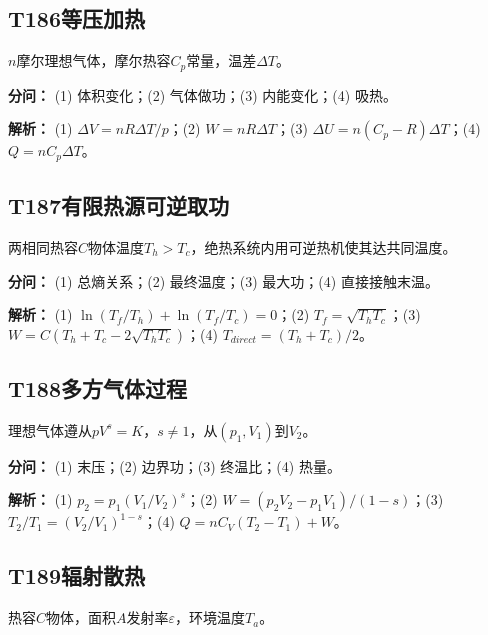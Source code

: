\medskip

\subsection*{T186\quad 等压加热}

$n$摩尔理想气体，摩尔热容$C_p$常量，温差$\Delta T$。

\par\textbf{分问：} (1) 体积变化；(2) 气体做功；(3) 内能变化；(4) 吸热。

\par\textbf{解析：} (1) $\Delta V=nR\Delta T/p$；(2) $W=nR\Delta T$；(3) $\Delta U=n(C_p-R)\Delta T$；(4) $Q=nC_p\Delta T$。

\medskip

\subsection*{T187\quad 有限热源可逆取功}

两相同热容$C$物体温度$T_h>T_c$，绝热系统内用可逆热机使其达共同温度。

\par\textbf{分问：} (1) 总熵关系；(2) 最终温度；(3) 最大功；(4) 直接接触末温。

\par\textbf{解析：} (1) $\ln(T_f/T_h)+\ln(T_f/T_c)=0$；(2) $T_f=\sqrt{T_hT_c}$；(3) $W=C(T_h+T_c-2\sqrt{T_hT_c})$；(4) $T_{direct}=(T_h+T_c)/2$。

\medskip

\subsection*{T188\quad 多方气体过程}

理想气体遵从$pV^s=K$，$s\ne1$，从$(p_1,V_1)$到$V_2$。

\par\textbf{分问：} (1) 末压；(2) 边界功；(3) 终温比；(4) 热量。

\par\textbf{解析：} (1) $p_2=p_1(V_1/V_2)^s$；(2) $W=(p_2V_2-p_1V_1)/(1-s)$；(3) $T_2/T_1=(V_2/V_1)^{1-s}$；(4) $Q=nC_V(T_2-T_1)+W$。

\medskip

\subsection*{T189\quad 辐射散热}

热容$C$物体，面积$A$发射率$\varepsilon$，环境温度$T_a$。

